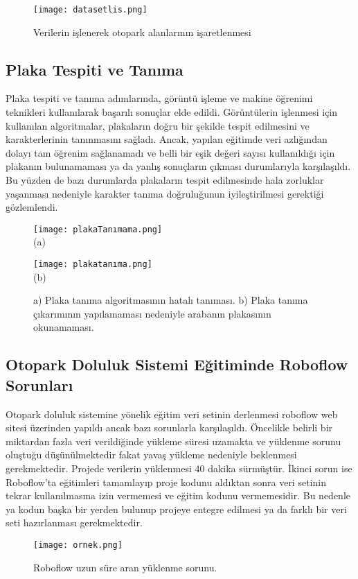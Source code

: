 \documentclass[]{article}
\begin{document}
	\begin{figure}[!ht]
		\centering
		\texttt{[image: datasetlis.png]}
		\caption{Verilerin işlenerek otopark alanlarının işaretlenmesi}
	\end{figure}
	
	\subsection{Plaka Tespiti ve Tanıma}
	Plaka tespiti ve tanıma adımlarında, görüntü işleme ve makine öğrenimi teknikleri kullanılarak başarılı sonuçlar elde edildi. Görüntülerin işlenmesi için kullanılan algoritmalar, plakaların doğru bir şekilde tespit edilmesini ve karakterlerinin tanınmasını sağladı. Ancak, yapılan eğitimde veri azlığından dolayı tam öğrenim sağlanamadı ve belli bir eşik değeri sayısı kullanıldığı için plakanın bulunamaması ya da yanlış sonuçların çıkması durumlarıyla karşılaşıldı. Bu yüzden de bazı durumlarda plakaların tespit edilmesinde hala zorluklar yaşanması nedeniyle karakter tanıma doğruluğunun iyileştirilmesi gerektiği gözlemlendi.
	\begin{figure}[htbp]
		\centering
		\begin{minipage}{0.43\textwidth}
			\centering
			\texttt{[image: plakaTanımama.png]}
			\\
			(a)
		\end{minipage}
		\hfill
		\begin{minipage}{0.43\textwidth}
			\centering
			\texttt{[image: plakatanıma.png]}
			\\
			(b)
		\end{minipage}
		\newline
		\caption{
			{a) Plaka tanıma algoritmasının hatalı tanıması.}
			{b) Plaka tanıma çıkarımının yapılamaması nedeniyle arabanın plakasının okunamaması.}}
	\end{figure}
	
	\subsection{Otopark Doluluk Sistemi Eğitiminde Roboflow Sorunları}
	Otopark doluluk sistemine yönelik eğitim veri setinin derlenmesi roboflow web sitesi üzerinden yapıldı ancak bazı sorunlarla karşılaşıldı. Öncelikle belirli bir miktardan fazla veri verildiğinde yükleme süresi uzamakta ve yüklenme sorunu oluştuğu düşünülmektedir fakat yavaş yükleme nedeniyle beklenmesi gerekmektedir. Projede verilerin yüklenmesi 40 dakika sürmüştür. İkinci sorun ise Roboflow'ta eğitimleri tamamlayıp proje kodunu aldıktan sonra veri setinin tekrar kullanılmasına izin vermemesi ve eğitim kodunu vermemesidir. Bu nedenle ya kodun başka bir yerden bulunup projeye entegre edilmesi ya da farklı bir veri seti hazırlanması gerekmektedir\cite{roboflowSite}.
	\begin{figure}[!ht]
		\centering
		\texttt{[image: ornek.png]}
		\caption{Roboflow uzun süre aran yüklenme sorunu.}
	\end{figure}
	
\end{document}

